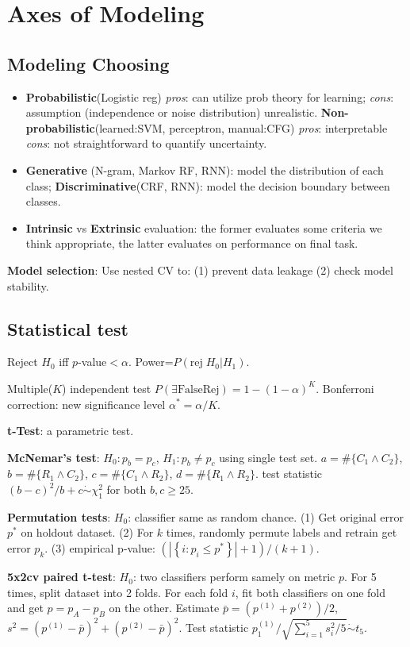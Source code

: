 \section{Axes of Modeling}

\subsection*{Modeling Choosing}

\begin{itemize}[itemsep=0pt,topsep=0pt, leftmargin=2pt, itemindent=5pt, labelwidth=5pt]
    \item \textbf{Probabilistic}(Logistic reg) \textit{pros}: can utilize prob theory for learning; \textit{cons}: assumption (independence or noise distribution) unrealistic. \textbf{Non-probabilistic}(learned:SVM, perceptron, manual:CFG) \textit{pros}: interpretable \textit{cons}: not straightforward to quantify uncertainty.
    \item \textbf{Generative} (N-gram, Markov RF, RNN): model the distribution of each class; \textbf{Discriminative}(CRF, RNN): model the decision boundary between classes.
    \item \textbf{Intrinsic} vs \textbf{Extrinsic} evaluation: the former evaluates some criteria we think appropriate, the latter evaluates on performance on final task.
\end{itemize}


\textbf{Model selection}: Use nested CV to: (1) prevent data leakage (2) check model stability.

\subsection*{Statistical test} Reject $H_{0}$ iff $p$-value$<\alpha$. Power=$P(\mathrm{rej}\;H_0|H_1)$. 

Multiple($K$) independent test $P(\exists\mathrm{False Rej})=1-(1-\alpha)^K$. Bonferroni correction: new significance level $\alpha^{*}=\alpha / K$.

\textbf{t-Test}: a parametric test.

\textbf{McNemar’s test}: $H_{0}: p_{b}=p_{c}$, $H_{1}: p_{b}\neq p_{c}$ using single test set. $a=\#\{C_1\land C_2\}$, $b=\#\{R_1\land C_2\}$, $c=\#\{C_1\land R_2\}$, $d=\#\{R_1\land R_2\}$. test statistic ${(b-c)^{2}}/{b+c} \dot{\sim} \chi_{1}^{2}$ for both $b,c\geq 25$.

\textbf{Permutation tests}: $H_{0}$: classifier same as random chance. (1) Get original error $p^*$ on holdout dataset. (2) For $k$ times, randomly permute labels and retrain get error $p_k$. (3) empirical p-value: $({\left|\left\{i: p_{i} \leq p^{*}\right\}\right|+1}) / ({k+1})$.

\textbf{5x2cv paired t-test}: $H_{0}$: two classifiers perform samely on metric $p$. For 5 times, split dataset into 2 folds. For each fold $i$, fit both classifiers on one fold and get $p=p_{A}-p_{B}$ on the other. Estimate $\bar{p}=(p^{(1)}+p^{(2)})/2$,$s^{2}=(p^{(1)}-\bar{p})^{2}+(p^{(2)}-\bar{p})^{2}$. Test statistic ${p_{1}^{(1)}}/{\sqrt{\sum_{i=1}^{5} s_{i}^{2}/5}} \dot{\sim} t_{5}$.
